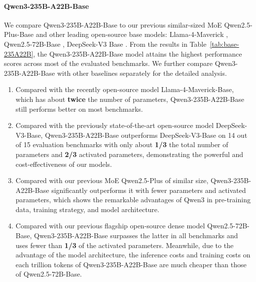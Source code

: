 \documentclass[dvipsnames]{article}
\begin{document}
\paragraph{Qwen3-235B-A22B-Base}
We compare Qwen3-235B-A22B-Base to our previous similar-sized MoE Qwen2.5-Plus-Base \citep{qwen2.5} and other leading open-source base models: Llama-4-Maverick \citep{llama4}, Qwen2.5-72B-Base \citep{qwen2.5}, DeepSeek-V3 Base \citep{deepseekv3}. From the results in Table~\ref{tab:base-235A22B}, the Qwen3-235B-A22B-Base model attains the highest performance scores across most of the evaluated benchmarks. We further compare Qwen3-235B-A22B-Base with other baselines separately for the detailed analysis.
\begin{enumerate}[label=(\arabic*)]
    \item  Compared with the recently open-source model Llama-4-Maverick-Base, which has about \textbf{twice} the number of parameters, Qwen3-235B-A22B-Base still performs better on most benchmarks.
    \item  Compared with the previously state-of-the-art open-source model DeepSeek-V3-Base, Qwen3-235B-A22B-Base outperforms DeepSeek-V3-Base on 14 out of 15 evaluation benchmarks with only about \textbf{1/3} the total number of parameters and \textbf{2/3} activated parameters, demonstrating the powerful and cost-effectiveness of our models. 
    \item  Compared with our previous MoE Qwen2.5-Plus of similar size, Qwen3-235B-A22B-Base significantly outperforms it with fewer parameters and activated parameters, which shows the remarkable advantages of Qwen3 in pre-training data, training strategy, and model architecture.
    \item  Compared with our previous flagship open-source dense model Qwen2.5-72B-Base, Qwen3-235B-A22B-Base surpasses the latter in all benchmarks and uses fewer than \textbf{1/3} of the activated parameters. Meanwhile, due to the advantage of the model architecture, the inference costs and training costs on each trillion tokens of Qwen3-235B-A22B-Base are much cheaper than those of Qwen2.5-72B-Base.
\end{enumerate}
\end{document}
